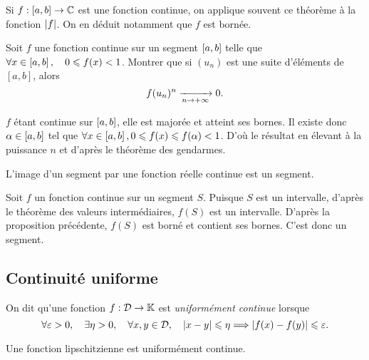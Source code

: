 \documentclass{magnolia}
\begin{document}
\begin{remarqueUnique}
\remarque Si $f:[a,b]\to\mathbb{C}$ est une fonction continue, on applique souvent ce théorème à la fonction $\left|f\right|$.
  On en déduit notamment que $f$ est bornée.
\end{remarqueUnique}

\begin{exoUnique}
\exo Soit $f$ une fonction continue sur un segment $\left[a,b\right]$ telle
  que $\forall x\in\left[a,b\right] ,\quad 0\leqslant f(x)<1$. Montrer que si
  $(u_n)$ est une suite d'éléments de $[a,b]$, alors
  \[f(u_n)^n\xrightarrow[n\rightarrow +\infty]{} 0.\]
  \begin{sol}
  $f$ étant continue sur $\left[a,b\right]$, elle est majorée et atteint ses bornes. Il existe donc $\alpha\in \left[a,b\right]$ tel que $\forall x \in \left[a,b\right], 0\leqslant f(x)\leqslant f(\alpha)<1$. D'où le résultat en élevant à la puissance $n$ et d'après le théorème des gendarmes.
  \end{sol}
\end{exoUnique}


 
\begin{proposition}[utile=-3]
L'image d'un segment par une fonction réelle continue est un segment.
\end{proposition}

\begin{preuve}
Soit $f$ un fonction continue sur un segment $S$. Puisque $S$ est un
intervalle, d'après le théorème des valeurs intermédiaires, $f(S)$ est
un intervalle. D'après la proposition précédente, $f(S)$ est borné et contient
ses bornes. C'est donc un segment.
\end{preuve}

\subsection{Continuité uniforme}

\begin{definition}[utile=-3]
On dit qu'une fonction $f:\mathcal{D}\to\mathbb{K}$ est \emph{uniformément continue} lorsque
\[\forall \varepsilon>0 ,\quad \exists \eta>0 ,\quad \forall x,y\in\mathcal{D},\quad
  \left|x-y\right|\leqslant\eta \Longrightarrow \left|f(x)-f(y)\right|\leqslant\varepsilon.\]
\end{definition}

\begin{remarqueUnique}
\remarque Une fonction lipschitzienne est uniformément continue.
\end{remarqueUnique}
\end{document}
